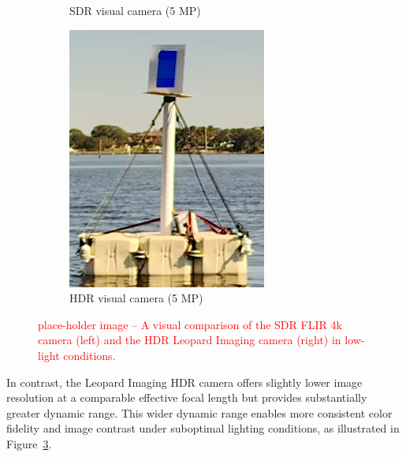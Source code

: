 \documentclass{erauthesis}
\begin{document}
\begin{figure}[htbp]
{\begin{subfigure}[t]{0.35\textwidth}
        \caption{SDR visual camera (5 MP)}
        \label{fig:fov_cam}
    \end{subfigure}
    \hspace{2em} %
    \begin{subfigure}[t]{0.378\textwidth}
        \centering
        \includegraphics[width=\textwidth]{Images/HDR_bright.png}
        \caption{HDR visual camera (5 MP)}
        \label{fig:fov_lidar}
    \end{subfigure}%
}
\caption{\textcolor{red}{place-holder image – A visual comparison of the \ac{SDR} FLIR 4k camera (left) and the \ac{HDR} Leopard Imaging camera (right) in low-light conditions.}}
\label{fig:HDR_compare}
\end{figure}

In contrast, the Leopard Imaging \ac{HDR} camera offers slightly lower image resolution at a comparable effective focal length but provides substantially greater dynamic range.
This wider dynamic range enables more consistent color fidelity and image contrast under suboptimal lighting conditions, as illustrated in Figure~\ref{fig:HDR_compare}.
\end{document}
